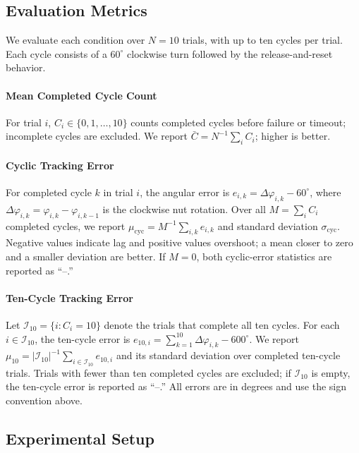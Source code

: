 \subsection{Evaluation Metrics}

We evaluate each condition over $N=10$ trials, with up to ten cycles per trial.
Each cycle consists of a $60^\circ$ clockwise turn followed by the
release-and-reset behavior.

\paragraph{Mean Completed Cycle Count}
For trial $i$, $C_i\in\{0,1,\ldots,10\}$ counts completed cycles before
failure or timeout; incomplete cycles are excluded. We report
$\bar C=N^{-1}\sum_i C_i$; higher is better.

\paragraph{Cyclic Tracking Error}
For completed cycle $k$ in trial $i$, the angular error is
$e_{i,k}=\Delta\varphi_{i,k}-60^\circ$, where
$\Delta\varphi_{i,k}=\varphi_{i,k}-\varphi_{i,k-1}$ is the clockwise nut
rotation. Over all $M=\sum_i C_i$ completed cycles, we report
$\mu_{\mathrm{cyc}}=M^{-1}\sum_{i,k}e_{i,k}$ and standard deviation
$\sigma_{\mathrm{cyc}}$. Negative values indicate lag and positive values
overshoot; a mean closer to zero and a smaller deviation are better. If $M=0$,
both cyclic-error statistics are reported as ``--.''

\paragraph{Ten-Cycle Tracking Error}
Let $\mathcal I_{10}=\{i:C_i=10\}$ denote the trials that complete all ten
cycles. For each $i\in\mathcal I_{10}$, the ten-cycle error is
$e_{10,i}=\sum_{k=1}^{10}\Delta\varphi_{i,k}-600^\circ$. We report
$\mu_{10}=|\mathcal I_{10}|^{-1}\sum_{i\in\mathcal I_{10}}e_{10,i}$ and its
standard deviation over completed ten-cycle trials. Trials with fewer than ten
completed cycles are excluded; if $\mathcal I_{10}$ is empty, the ten-cycle
error is reported as ``--.'' All errors are in degrees and use the sign
convention above.

\subsection{Experimental Setup}

